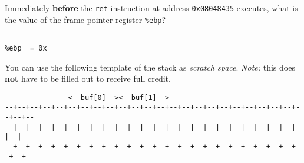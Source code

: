 \begin{subproblem}
\begin{subproblem}

\item
Immediately {\bf before} the {\tt ret} instruction at address 
{\tt 0x08048435} executes, what is the value of the frame pointer 
register \verb:%ebp:? 
\begin{verbatim}

%ebp  = 0x____________________

\end{verbatim}

\end{subproblem}

\end{subproblem}

You can use the following template of the stack 
as {\em scratch space}. {\em Note:} this
does {\bf not} have to be filled out to receive full credit.
{\small{
\begin{verbatim}
               <- buf[0] -><- buf[1] ->
--+--+--+--+--+--+--+--+--+--+--+--+--+--+--+--+--+--+--+--+--+--+--+--+--+--
  |  |  |  |  |  |  |  |  |  |  |  |  |  |  |  |  |  |  |  |  |  |  |  |  |  
--+--+--+--+--+--+--+--+--+--+--+--+--+--+--+--+--+--+--+--+--+--+--+--+--+--
\end{verbatim}
}}
